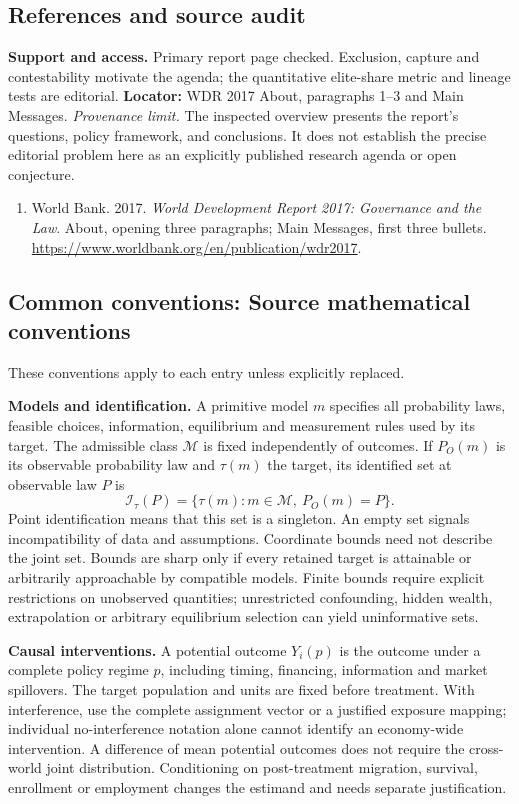 \documentclass[11pt,a4paper]{article}
\begin{document}
\subsection*{References and source audit}
\textbf{Support and access.} Primary report page checked. Exclusion, capture and contestability motivate the agenda; the quantitative elite-share metric and lineage tests are editorial. \textbf{Locator:} WDR 2017 About, paragraphs 1--3 and Main Messages. \emph{Provenance limit.} The inspected overview presents the report's questions, policy framework, and conclusions. It does not establish the precise editorial problem here as an explicitly published research agenda or open conjecture.
\begin{enumerate}\raggedright
\item\hypertarget{definitions:source:30007667:1}{} World Bank. 2017. \emph{World Development Report 2017: Governance and the Law}. About, opening three paragraphs; Main Messages, first three bullets.
\url{https://www.worldbank.org/en/publication/wdr2017}.
\end{enumerate}

\subsection*{Common conventions: Source mathematical conventions}

These conventions apply to each entry unless explicitly replaced.

\textbf{Models and identification.} A primitive model \(m\) specifies all probability laws, feasible choices, information, equilibrium and measurement rules used by its target. The admissible class \(\mathcal M\) is fixed independently of outcomes. If \(P_O(m)\) is its observable probability law and \(\tau(m)\) the target, its identified set at observable law \(P\) is
\[
 \mathcal I_\tau(P)=\{\tau(m):m\in\mathcal M,\ P_O(m)=P\}.
\]
Point identification means that this set is a singleton. An empty set signals incompatibility of data and assumptions. Coordinate bounds need not describe the joint set. Bounds are sharp only if every retained target is attainable or arbitrarily approachable by compatible models. Finite bounds require explicit restrictions on unobserved quantities; unrestricted confounding, hidden wealth, extrapolation or arbitrary equilibrium selection can yield uninformative sets.

\textbf{Causal interventions.} A potential outcome \(Y_i(p)\) is the outcome under a complete policy regime \(p\), including timing, financing, information and market spillovers. The target population and units are fixed before treatment. With interference, use the complete assignment vector or a justified exposure mapping; individual no-interference notation alone cannot identify an economy-wide intervention. A difference of mean potential outcomes does not require the cross-world joint distribution. Conditioning on post-treatment migration, survival, enrollment or employment changes the estimand and needs separate justification.
\end{document}
